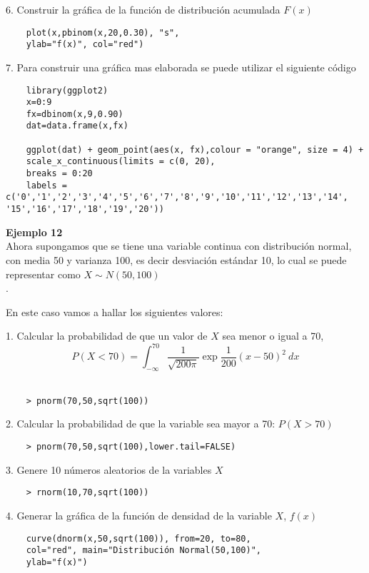 \documentclass[base=hide,12pt]{elegantbook}
\begin{document}
6. Construir la gráfica de la función de distribución acumulada   $F(x)$\\
\begin{lstlisting}
	plot(x,pbinom(x,20,0.30), "s", 
	ylab="f(x)", col="red")
\end{lstlisting}

7. Para construir una gráfica mas elaborada se puede utilizar el siguiente código
\begin{lstlisting}
	library(ggplot2)
	x=0:9
	fx=dbinom(x,9,0.90)
	dat=data.frame(x,fx)
	
	ggplot(dat) + geom_point(aes(x, fx),colour = "orange", size = 4) +
	scale_x_continuous(limits = c(0, 20),
	breaks = 0:20 
	labels = c('0','1','2','3','4','5','6','7','8','9','10','11','12','13','14', '15','16','17','18','19','20'))
\end{lstlisting}


\vspace{1cm}
\textcolor{col3}{\bf \large Ejemplo  12}\\ 
Ahora supongamos que se tiene una variable continua con distribución normal, con media 50 y varianza 100, es decir desviación estándar 10, lo cual se puede representar como $X\sim N(50,100)$\\. 

En este caso vamos a hallar los siguientes valores: 

1. Calcular la probabilidad de que un valor de $X$ sea menor o igual a 70, 
$$P(X<70) =\displaystyle\int_{-\infty}^{70} \dfrac{1}{\sqrt{200 \pi }} \exp{\frac{1}{200 }(x-50)^{2}} \:dx$$ \\

\begin{lstlisting}
	> pnorm(70,50,sqrt(100))
\end{lstlisting}


2. Calcular la probabilidad de que la variable sea mayor a 70: $P(X>70)$ \\
\begin{lstlisting}
	> pnorm(70,50,sqrt(100),lower.tail=FALSE)
\end{lstlisting}

3. Genere 10 números aleatorios de la variables $X$
\begin{lstlisting}
	> rnorm(10,70,sqrt(100))
\end{lstlisting}


4. Generar la gráfica de la función de densidad de la variable $X$,  $f(x)$
\begin{lstlisting}
	curve(dnorm(x,50,sqrt(100)), from=20, to=80, 
	col="red", main="Distribución Normal(50,100)",
	ylab="f(x)")
\end{lstlisting}
\end{document}
